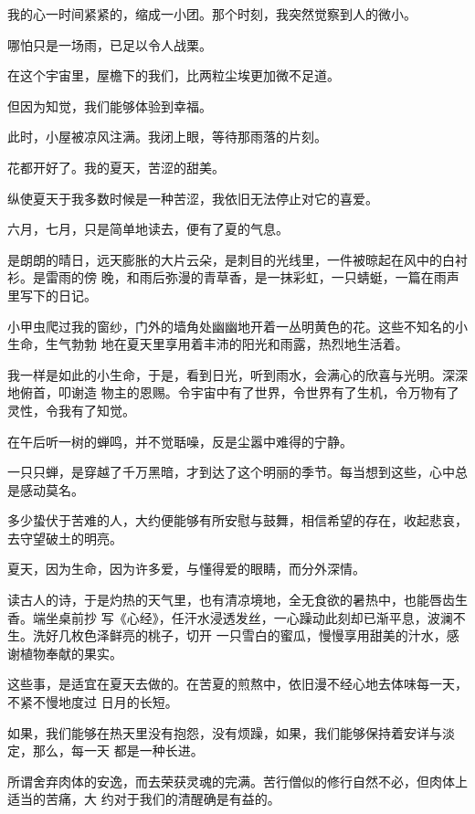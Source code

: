 \documentclass[12pt,a4paper]{article}
\def\blankrev{\vspace{1ex}}									%
\begin{document}
		我的心一时间紧紧的，缩成一小团。那个时刻，我突然觉察到人的微小。

		哪怕只是一场雨，已足以令人战栗。

		在这个宇宙里，屋檐下的我们，比两粒尘埃更加微不足道。

		但因为知觉，我们能够体验到幸福。

		此时，小屋被凉风注满。我闭上眼，等待那雨落的片刻。

	\endwriting



		花都开好了。我的夏天，苦涩的甜美。


		\blankrev
		纵使夏天于我多数时候是一种苦涩，我依旧无法停止对它的喜爱。

		六月，七月，只是简单地读去，便有了夏的气息。

		是朗朗的晴日，远天膨胀的大片云朵，是刺目的光线里，一件被晾起在风中的白衬衫。是雷雨的傍
	晚，和雨后弥漫的青草香，是一抹彩虹，一只蜻蜓，一篇在雨声里写下的日记。

		小甲虫爬过我的窗纱，门外的墙角处幽幽地开着一丛明黄色的花。这些不知名的小生命，生气勃勃
	地在夏天里享用着丰沛的阳光和雨露，热烈地生活着。

		我一样是如此的小生命，于是，看到日光，听到雨水，会满心的欣喜与光明。深深地俯首，叩谢造
	物主的恩赐。令宇宙中有了世界，令世界有了生机，令万物有了灵性，令我有了知觉。

		在午后听一树的蝉鸣，并不觉聒噪，反是尘嚣中难得的宁静。\par
		一只只蝉，是穿越了千万黑暗，才到达了这个明丽的季节。每当想到这些，心中总是感动莫名。\par
		多少蛰伏于苦难的人，大约便能够有所安慰与鼓舞，相信希望的存在，收起悲哀，去守望破土的明亮。

		夏天，因为生命，因为许多爱，与懂得爱的眼睛，而分外深情。

		读古人的诗，于是灼热的天气里，也有清凉境地，全无食欲的暑热中，也能唇齿生香。端坐桌前抄
	写《心经》，任汗水浸透发丝，一心躁动此刻却已渐平息，波澜不生。洗好几枚色泽鲜亮的桃子，切开
	一只雪白的蜜瓜，慢慢享用甜美的汁水，感谢植物奉献的果实。

		这些事，是适宜在夏天去做的。在苦夏的煎熬中，依旧漫不经心地去体味每一天，不紧不慢地度过
	日月的长短。

		如果，我们能够在热天里没有抱怨，没有烦躁，如果，我们能够保持着安详与淡定，那么，每一天
	都是一种长进。

		所谓舍弃肉体的安逸，而去荣获灵魂的完满。苦行僧似的修行自然不必，但肉体上适当的苦痛，大
	约对于我们的清醒确是有益的。
\end{document}
